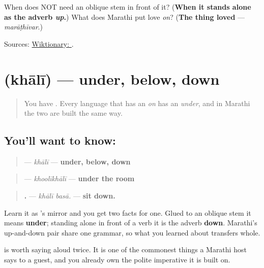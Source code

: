 \begin{tcolorbox}[breakable,colback=teal!4,colframe=teal!35!black,title={Before you move on}]
When does \textbf{} NOT need an oblique stem in front of it? (\textbf{When it stands alone as the adverb \emph{up}.}) What does Marathi put love \emph{on}? (\textbf{The thing loved} — \emph{marāṭhīvar}.)

Sources: \href{https://en.wiktionary.org/wiki/\%E0\%A4\%B5\%E0\%A4\%B0}{Wiktionary: }.
\end{tcolorbox}
\section[\texorpdfstring{\mr{खाली} (khālī)}{खाली (khālī)}]{ (khālī) — under, below, down}

\label{lesson:MR-C42-khaali}



\begin{quote}
You have \textbf{}. Every language that has an \emph{on} has an \emph{under}, and in Marathi the two are built the same way.
\end{quote}

\subsection*{You'll want to know: }
\begin{quote}
\textbf{} — \emph{khālī} — \textbf{under, below, down}
\end{quote}

\begin{quote}
\textbf{} — \emph{khoolīkhālī} — \textbf{under the room}
\end{quote}

\begin{quote}
\textbf{ .} — \emph{khālī basā.} — \textbf{sit down.}
\end{quote}

Learn it as \textbf{}'s mirror and you get two facts for one. Glued to an oblique stem it means \textbf{under}; standing alone in front of a verb it is the adverb \textbf{down}. Marathi's up-and-down pair share one grammar, so what you learned about \textbf{} transfers whole.

\textbf{ } is worth saying aloud twice. It is one of the commonest things a Marathi host says to a guest, and you already own the polite imperative it is built on.


